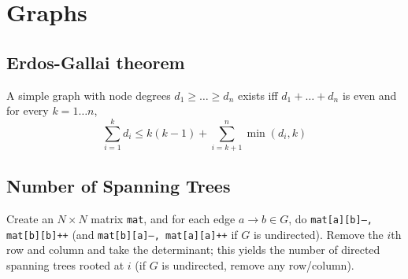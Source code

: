 \section{Graphs}
\subsection{Erdos-Gallai theorem}
A simple graph with node degrees $d_1 \ge \dots \ge d_n$ exists iff $d_1 + \dots + d_n$ is even and for every $k = 1\dots n$,
\[\sum _{i=1}^{k}d_{i}\leq k(k-1)+\sum _{i=k+1}^{n}\min(d_{i},k)\]
\subsection{Number of Spanning Trees}
Create an $N\times N$ matrix \texttt{mat}, and for each edge $a \rightarrow b \in G$, do
\texttt{mat[a][b]--, mat[b][b]++} (and \texttt{mat[b][a]--, mat[a][a]++} if $G$ is undirected).
Remove the $i$th row and column and take the determinant; this yields the number of directed spanning trees rooted at $i$
(if $G$ is undirected, remove any row/column).
